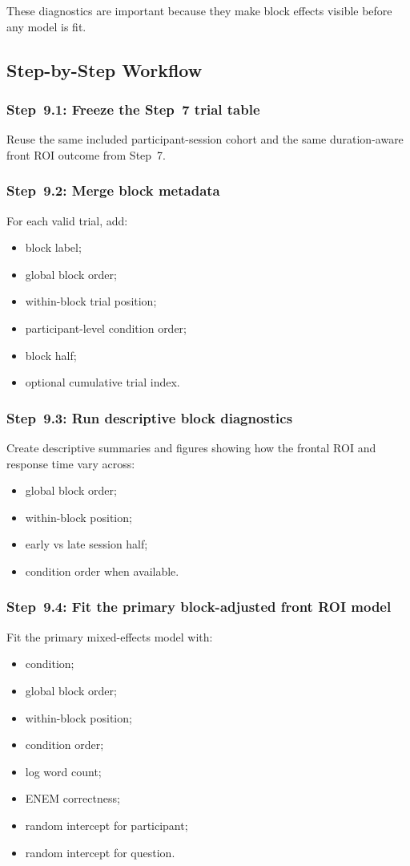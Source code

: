 These diagnostics are important because they make block effects visible before any model is fit.

\subsection{Step-by-Step Workflow}

\subsubsection{Step~9.1: Freeze the Step~7 trial table}
Reuse the same included participant-session cohort and the same duration-aware front ROI outcome from Step~7.

\subsubsection{Step~9.2: Merge block metadata}
For each valid trial, add:
\begin{itemize}
    \item block label;
    \item global block order;
    \item within-block trial position;
    \item participant-level condition order;
    \item block half;
    \item optional cumulative trial index.
\end{itemize}

\subsubsection{Step~9.3: Run descriptive block diagnostics}
Create descriptive summaries and figures showing how the frontal ROI and response time vary across:
\begin{itemize}
    \item global block order;
    \item within-block position;
    \item early vs late session half;
    \item condition order when available.
\end{itemize}

\subsubsection{Step~9.4: Fit the primary block-adjusted front ROI model}
Fit the primary mixed-effects model with:
\begin{itemize}
    \item condition;
    \item global block order;
    \item within-block position;
    \item condition order;
    \item log word count;
    \item ENEM correctness;
    \item random intercept for participant;
    \item random intercept for question.
\end{itemize}

